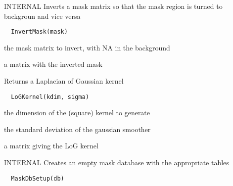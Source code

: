 \documentclass[a4paper]{book}
\begin{document}
%
\begin{Description}\relax
INTERNAL Inverts a mask matrix so that the mask region is
turned to backgroun and vice versa
\end{Description}
%
\begin{Usage}
\begin{verbatim}
  InvertMask(mask)
\end{verbatim}
\end{Usage}
%
\begin{Arguments}
\begin{ldescription}
\item[\code{mask}] the mask matrix to invert, with NA in the
background
\end{ldescription}
\end{Arguments}
%
\begin{Value}
a matrix with the inverted mask
\end{Value}
%
\begin{Description}\relax
Returns a Laplacian of Gaussian kernel
\end{Description}
%
\begin{Usage}
\begin{verbatim}
  LoGKernel(kdim, sigma)
\end{verbatim}
\end{Usage}
%
\begin{Arguments}
\begin{ldescription}
\item[\code{kdim}] the dimension of the (square) kernel to
generate

\item[\code{sigma}] the standard deviation of the gaussian
smoother
\end{ldescription}
\end{Arguments}
%
\begin{Value}
a matrix giving the LoG kernel
\end{Value}
%
\begin{Description}\relax
INTERNAL Creates an empty mask database with the
appropriate tables
\end{Description}
%
\begin{Usage}
\begin{verbatim}
  MaskDbSetup(db)
\end{verbatim}
\end{Usage}
\end{document}
